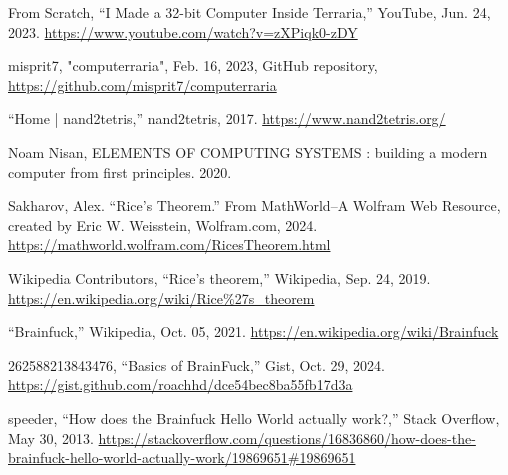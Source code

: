 \documentclass[12pt]{report} %
\begin{document}
\begin{singlespace}
\begin{thebibliography}{}
             From Scratch, “I Made a 32-bit Computer Inside Terraria,” YouTube, Jun. 24, 2023. \href{https://www.youtube.com/watch?v=zXPiqk0-zDY}{https://www.youtube.com/watch?v=zXPiqk0-zDY}

             misprit7, "computerraria", Feb. 16, 2023, GitHub repository, \href{https://github.com/misprit7/computerraria}{https://github.com/misprit7/computerraria}
            
             “Home | nand2tetris,” nand2tetris, 2017. \href{https://www.nand2tetris.org/}{https://www.nand2tetris.org/}

             Noam Nisan, ELEMENTS OF COMPUTING SYSTEMS : building a modern computer from first principles. 2020.


             Sakharov, Alex. “Rice’s Theorem.” From MathWorld--A Wolfram Web Resource, created by Eric W. Weisstein, Wolfram.com, 2024. \href{https://mathworld.wolfram.com/RicesTheorem.html}{https://mathworld.wolfram.com/RicesTheorem.html}
            
             Wikipedia Contributors, “Rice’s theorem,” Wikipedia, Sep. 24, 2019. \href{https://en.wikipedia.org/wiki/Rice%27s_theorem}{https://en.wikipedia.org/wiki/Rice\%27s\_theorem}
            
             “Brainfuck,” Wikipedia, Oct. 05, 2021. \href{https://en.wikipedia.org/wiki/Brainfuck}{https://en.wikipedia.org/wiki/Brainfuck}
            
             262588213843476, “Basics of BrainFuck,” Gist, Oct. 29, 2024. \href{https://gist.github.com/roachhd/dce54bec8ba55fb17d3a}{https://gist.github.com/roachhd/dce54bec8ba55fb17d3a}

             speeder, “How does the Brainfuck Hello World actually work?,” Stack Overflow, May 30, 2013. \href{https://stackoverflow.com/questions/16836860/how-does-the-brainfuck-hello-world-actually-work/19869651#19869651}{https://stackoverflow.com/questions/16836860/how-does-the-brainfuck-hello-world-actually-work/19869651\#19869651}
                        

\end{thebibliography}
\end{singlespace}
\end{document}

